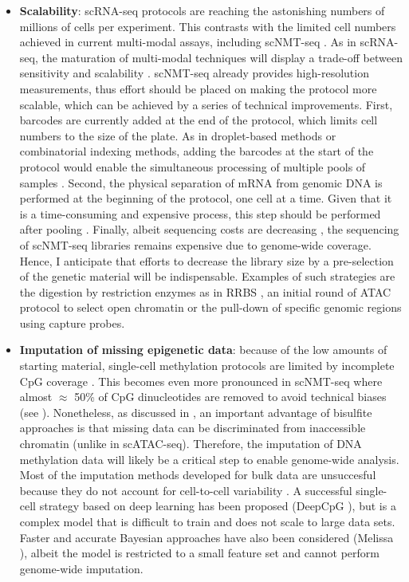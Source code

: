\begin{itemize}

	\item \textbf{Scalability}: scRNA-seq protocols are reaching the astonishing numbers of millions of cells per experiment. This contrasts with the limited cell numbers achieved in current multi-modal assays, including scNMT-seq \cite{Cao2019,Cao2018,Guo2017}. As in scRNA-seq, the maturation of multi-modal techniques will display a trade-off between sensitivity and scalability \cite{Chappell2018}. scNMT-seq already provides high-resolution measurements, thus effort should be placed on making the protocol more scalable, which can be achieved by a series of technical improvements. First, barcodes are currently added at the end of the protocol, which limits cell numbers to the size of the plate. As in droplet-based methods or combinatorial indexing methods, adding the barcodes at the start of the protocol would enable the simultaneous processing of multiple pools of samples \cite{Dey2015,Mulqueen2018}. Second, the physical separation of mRNA from genomic DNA is performed at the beginning of the protocol, one cell at a time. Given that it is a time-consuming and expensive process, this step should be performed after pooling \cite{Dey2015}. Finally, albeit sequencing costs are decreasing \cite{Svensson2018}, the sequencing of scNMT-seq libraries remains expensive due to genome-wide coverage. Hence, I anticipate that efforts to decrease the library size by a pre-selection of the genetic material will be indispensable. Examples of such strategies are the digestion by restriction enzymes as in RRBS \cite{Guo2013}, an initial round of ATAC protocol to select open chromatin \cite{Spektor2018} or the pull-down of specific genomic regions using capture probes.

	\item \textbf{Imputation of missing epigenetic data}: because of the low amounts of starting material, single-cell methylation protocols are limited by incomplete CpG coverage \cite{Angermueller2017}. This becomes even more pronounced in scNMT-seq where almost $\approx$ 50\% of CpG dinucleotides are removed to avoid technical biases (see ). Nonetheless, as discussed in , an important advantage of bisulfite approaches is that missing data can be discriminated from inaccessible chromatin (unlike in scATAC-seq). Therefore, the imputation of DNA methylation data will likely be a critical step to enable genome-wide analysis. Most of the imputation methods developed for bulk data are unsuccesful because they do not account for cell-to-cell variability \cite{Angermueller2017}. A successful single-cell strategy based on deep learning has been proposed (DeepCpG \cite{Angermueller2017}), but is a complex model that is difficult to train and does not scale to large data sets. Faster and accurate Bayesian approaches have also been considered (Melissa \cite{Kapourani2018b}), albeit the model is restricted to a small feature set and cannot perform genome-wide imputation.


\end{itemize}

